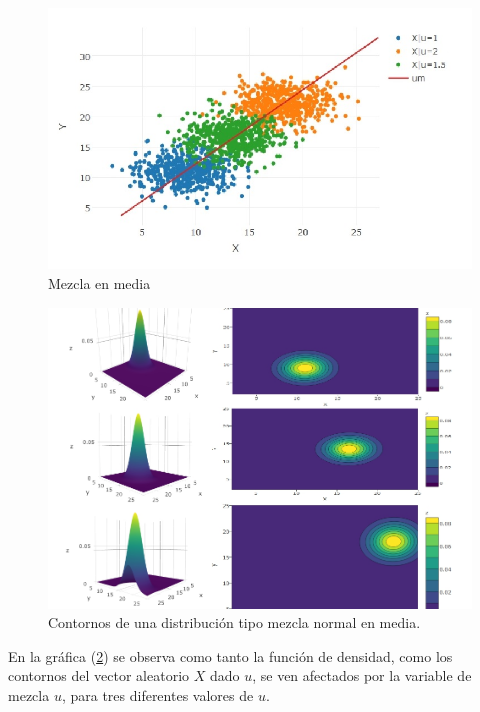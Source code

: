 \begin{figure}[h]
	\centering
	\includegraphics[width=1.15\linewidth]{Figuras/RplotG}
	\caption{Mezcla en media}
	\label{fig:RplotG}
\end{figure}


\begin{figure}[h]
	\centering
	\includegraphics[width=1.15\linewidth]{Figuras/mm}
	\caption{Contornos de una distribución tipo mezcla normal en media.}
	\label{fig:mm}
\end{figure}

\pagebreak
En la gráfica (\ref{fig:mm}) se observa como tanto la función de densidad, como los contornos del vector aleatorio $X$ dado $u$, se ven afectados por la variable de mezcla $u$, para tres diferentes valores de $u$.\\

